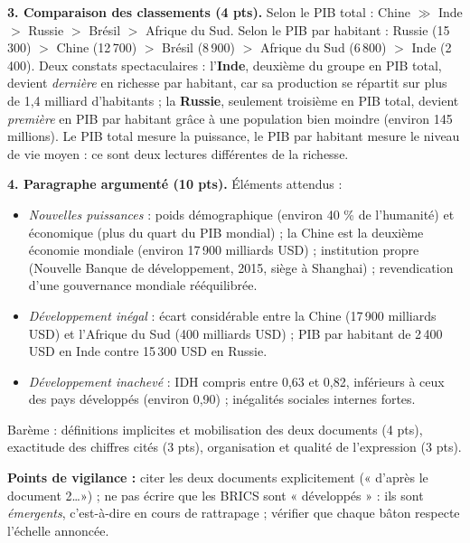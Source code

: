 \documentclass[11pt]{article}
\begin{document}
\begin{corrige}
\textbf{3. Comparaison des classements (4 pts).} Selon le PIB total : Chine $\gg$ Inde $>$ Russie $>$ Brésil $>$ Afrique du Sud. Selon le PIB par habitant : Russie (15\,300) $>$ Chine (12\,700) $>$ Brésil (8\,900) $>$ Afrique du Sud (6\,800) $>$ Inde (2\,400). Deux constats spectaculaires : l'\textbf{Inde}, deuxième du groupe en PIB total, devient \emph{dernière} en richesse par habitant, car sa production se répartit sur plus de 1,4 milliard d'habitants ; la \textbf{Russie}, seulement troisième en PIB total, devient \emph{première} en PIB par habitant grâce à une population bien moindre (environ 145 millions). Le PIB total mesure la puissance, le PIB par habitant mesure le niveau de vie moyen : ce sont deux lectures différentes de la richesse.

\textbf{4. Paragraphe argumenté (10 pts).} Éléments attendus :
\begin{itemize}
\item \emph{Nouvelles puissances} : poids démographique (environ 40 \% de l'humanité) et économique (plus du quart du PIB mondial) ; la Chine est la deuxième économie mondiale (environ 17\,900 milliards USD) ; institution propre (Nouvelle Banque de développement, 2015, siège à Shanghai) ; revendication d'une gouvernance mondiale rééquilibrée.
\item \emph{Développement inégal} : écart considérable entre la Chine (17\,900 milliards USD) et l'Afrique du Sud (400 milliards USD) ; PIB par habitant de 2\,400 USD en Inde contre 15\,300 USD en Russie.
\item \emph{Développement inachevé} : IDH compris entre 0,63 et 0,82, inférieurs à ceux des pays développés (environ 0,90) ; inégalités sociales internes fortes.
\end{itemize}
Barème : définitions implicites et mobilisation des deux documents (4 pts), exactitude des chiffres cités (3 pts), organisation et qualité de l'expression (3 pts).

\textbf{Points de vigilance :} citer les deux documents explicitement (« d'après le document 2\ldots ») ; ne pas écrire que les BRICS sont « développés » : ils sont \emph{émergents}, c'est-à-dire en cours de rattrapage ; vérifier que chaque bâton respecte l'échelle annoncée.
\end{corrige}
\end{document}
